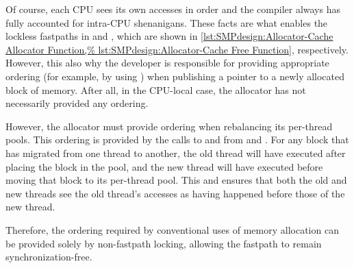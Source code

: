 Of course, each CPU sees its own accesses in order and the compiler
always has fully accounted for intra-CPU shenanigans.
These facts are what enables the lockless fastpaths in
 and , which are shown in
\cref{lst:SMPdesign:Allocator-Cache Allocator Function,%
lst:SMPdesign:Allocator-Cache Free Function},
respectively.
However, this also why the developer is responsible for providing
appropriate ordering (for example, by using )
when publishing a pointer to a newly allocated block of memory.
After all, in the CPU-local case, the allocator has not necessarily
provided any ordering.

However, the allocator must provide ordering when rebalancing its
per-thread pools.
This ordering is provided by the calls to  and
 from  and .
For any block that has migrated from one thread to another, the old
thread will have executed  after
placing the block in the  pool, and the new thread will
have executed  before moving that
block to its per-thread pool.
This  and  ensures that both the
old and new threads see the old thread's accesses as having happened
before those of the new thread.

\QuickQuizEnd

Therefore, the ordering required by conventional uses of memory allocation
can be provided solely by non-fastpath locking, allowing the fastpath to
remain synchronization-free.



